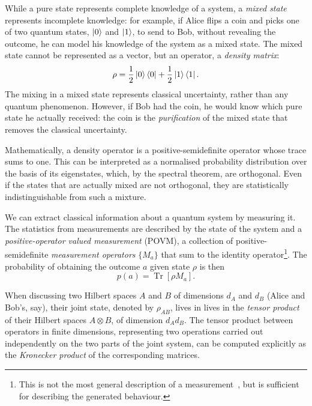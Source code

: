 \documentclass[10pt, a4paper]{article}
\numberwithin{equation}{section} %
\theoremstyle{definition}
\theoremstyle{plain}
\newcommand{\?}{\mathrel{?}} %
\newcommand{\Tr}[2][]{\mathop{\mathrm{Tr}#1}\left[ #2 \right]} %
\begin{document}
\begin{appendices}
                    While a pure state represents complete knowledge of a system, a \emph{mixed state} represents incomplete knowledge: for example, if Alice flips a coin and picks one of two quantum states, \(\ket{0}\) and \(\ket{1}\), to send to Bob, without revealing the outcome, he can model his knowledge of the system as a mixed state. The mixed state cannot be represented as a vector, but an operator, a \emph{density matrix}:
                    \[ \rho = \frac{1}{2} \ket{0}\bra{0} + \frac{1}{2} \ket{1}\bra{1}. \]
                    The mixing in a mixed state represents classical uncertainty, rather than any quantum phenomenon. However, if Bob had the coin, he would know which pure state he actually received: the coin is the \emph{purification} of the mixed state that removes the classical uncertainty.

                    Mathematically, a density operator is a positive-semidefinite operator whose trace sums to one. This can be interpreted as a normalised probability distribution over the basis of its eigenstates, which, by the spectral theorem, are orthogonal. Even if the states that are actually mixed are not orthogonal, they are statistically indistinguishable from such a mixture.

                    We can extract classical information about a quantum system by measuring it. The statistics from measurements are described by the state of the system and a \emph{positive-operator valued measurement} (POVM), a collection of positive-semidefinite \emph{measurement operators} \(\{M_a\}\) that sum to the identity operator\footnote{This is not the most general description of a measurement~\cite[Box 2.5]{NielsenChuang}, but is sufficient for describing the generated behaviour.}. The probability of obtaining the outcome \(a\) given state \(\rho\) is then
                    \begin{equation}
                      p(a) = \Tr{\rho M_a}.
                    \end{equation}

                    When discussing two Hilbert spaces \(A\) and \(B\) of dimensions \(d_A\) and \(d_B\) (Alice and Bob's, say), their joint state, denoted by \(\rho_{AB}\), lives in lives in the \emph{tensor product} of their Hilbert spaces \(A \otimes B\), of dimension \(d_A d_B\). The tensor product between operators in finite dimensions, representing two operations carried out independently on the two parts of the joint system, can be computed explicitly as the \emph{Kronecker product} of the corresponding matrices.


\end{appendices}
\end{document}
